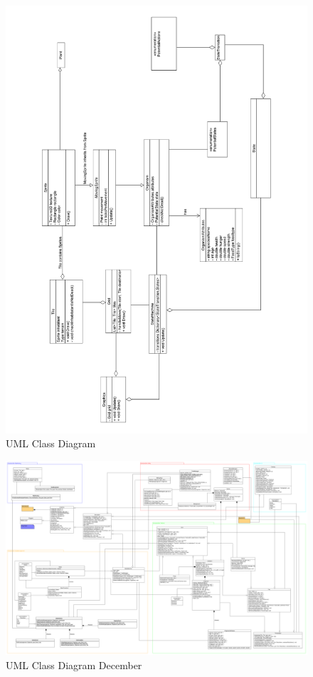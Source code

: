 \documentclass[a4paper, oneside, 11pt]{report}
\begin{document}
{\begin{figure}[H]
	\caption{UML Class Diagram}\label{classdiagram}
	\includegraphics[width=\textwidth]{class-diagram}
\end{figure}

\begin{landscape}
	\begin{figure}[H]
		\caption{UML Class Diagram December}\label{classdiagram-2}
		\includegraphics[height=\textheight]{class-diagram-2}
	\end{figure}
\end{landscape}


}
\end{document}
